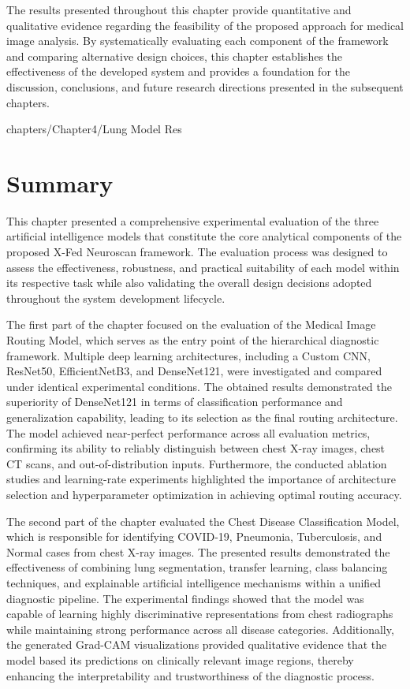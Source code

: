 The results presented throughout this chapter provide quantitative and qualitative evidence regarding the feasibility of the proposed approach for medical image analysis. By systematically evaluating each component of the framework and comparing alternative design choices, this chapter establishes the effectiveness of the developed system and provides a foundation for the discussion, conclusions, and future research directions presented in the subsequent chapters.





 {chapters/Chapter4/Lung Model Res}

\section{Summary}

This chapter presented a comprehensive experimental evaluation of the three artificial intelligence models that constitute the core analytical components of the proposed X-Fed Neuroscan framework. The evaluation process was designed to assess the effectiveness, robustness, and practical suitability of each model within its respective task while also validating the overall design decisions adopted throughout the system development lifecycle.

The first part of the chapter focused on the evaluation of the Medical Image Routing Model, which serves as the entry point of the hierarchical diagnostic framework. Multiple deep learning architectures, including a Custom CNN, ResNet50, EfficientNetB3, and DenseNet121, were investigated and compared under identical experimental conditions. The obtained results demonstrated the superiority of DenseNet121 in terms of classification performance and generalization capability, leading to its selection as the final routing architecture. The model achieved near-perfect performance across all evaluation metrics, confirming its ability to reliably distinguish between chest X-ray images, chest CT scans, and out-of-distribution inputs. Furthermore, the conducted ablation studies and learning-rate experiments highlighted the importance of architecture selection and hyperparameter optimization in achieving optimal routing accuracy.

The second part of the chapter evaluated the Chest Disease Classification Model, which is responsible for identifying COVID-19, Pneumonia, Tuberculosis, and Normal cases from chest X-ray images. The presented results demonstrated the effectiveness of combining lung segmentation, transfer learning, class balancing techniques, and explainable artificial intelligence mechanisms within a unified diagnostic pipeline. The experimental findings showed that the model was capable of learning highly discriminative representations from chest radiographs while maintaining strong performance across all disease categories. Additionally, the generated Grad-CAM visualizations provided qualitative evidence that the model based its predictions on clinically relevant image regions, thereby enhancing the interpretability and trustworthiness of the diagnostic process.

